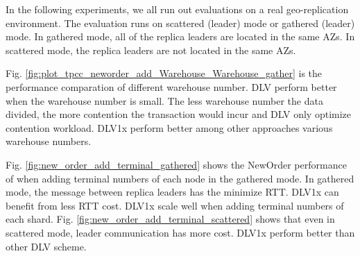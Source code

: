 \documentclass[conference]{IEEEtran}
\begin{document}
In the following experiments, we all run out evaluations on a real geo-replication environment.
The evaluation runs on scattered (leader) mode or gathered (leader) mode.
In gathered mode, all of the replica leaders are located in the same AZs.
In scattered mode, the replica leaders are not located in the same AZs.

Fig.    \ref{fig:plot_tpcc_neworder_add_Warehouse_Warehouse_gather} is the performance comparation of different warehouse number.
DLV perform better when the warehouse number is small.
The less warehouse number the data divided, the more contention the transaction would incur and DLV only optimize contention workload.
DLV1x perform better among other approaches various warehouse numbers.


Fig.    \ref{fig:new_order_add_terminal_gathered} shows the NewOrder performance of when adding terminal numbers of each node in the gathered mode.
In gathered mode, the message between replica leaders has the minimize RTT.
DLV1x can benefit from less RTT cost.
DLV1x scale well when adding terminal numbers of each shard.
Fig.    \ref{fig:new_order_add_terminal_scattered} shows that even in scattered mode, leader communication has more cost.
DLV1x perform better than other DLV scheme.
\end{document}
